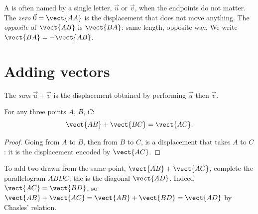 \begin{notation}
A  is often named by a single letter, $\vec u$ or $\vec v$, when the
endpoints do not matter. The \emph{zero } $\vec 0 = \vect{AA}$ is
the displacement that does not move anything. The \emph{opposite} of
$\vect{AB}$ is $\vect{BA}$: same length, opposite way. We write
$\vect{BA} = -\vect{AB}$.
\end{notation}

\section{Adding vectors}

\begin{definition}\label{def:g10:vectors:sum}
The \emph{sum} $\vec u + \vec v$ is the displacement
obtained by performing $\vec u$ then $\vec v$.
\end{definition}

\begin{theorem}\label{thm:g10:vectors:chasles}
For any three points $A$, $B$, $C$:
\[
\vect{AB} + \vect{BC} = \vect{AC}.
\]
\end{theorem}

\begin{proof}
Going from $A$ to $B$, then from $B$ to $C$, is a displacement that takes
$A$ to $C$: it is the displacement encoded by $\vect{AC}$.
\end{proof}

\begin{remark}
To add two  drawn from the same point, $\vect{AB} + \vect{AC}$,
complete the parallelogram $ABDC$: the  is the diagonal $\vect{AD}$.
Indeed $\vect{AC} = \vect{BD}$, so
$\vect{AB} + \vect{AC} = \vect{AB} + \vect{BD} = \vect{AD}$ by Chasles'
relation.
\end{remark}

